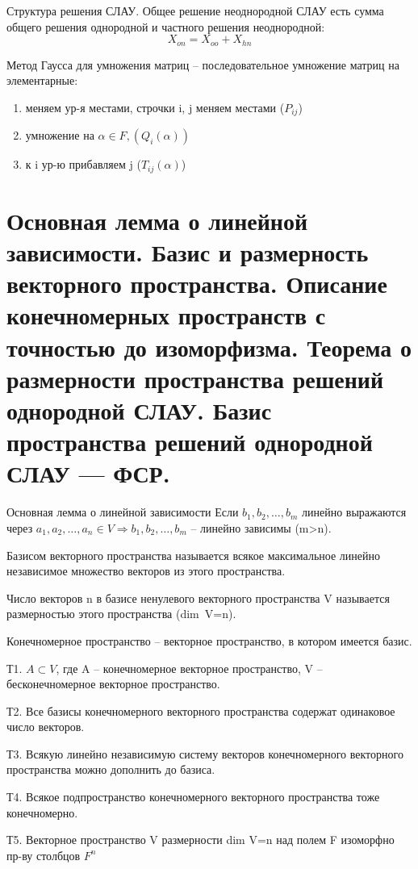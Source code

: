 \documentclass{article}
\begin{document}
\textsf{Структура решения СЛАУ.} Общее решение неоднородной СЛАУ есть сумма общего решения однородной и частного решения неоднородной:
$$X_{on}=X_{oo}+X_{hn}$$


\textsf{Метод Гаусса для умножения матриц} – последовательное умножение матриц на элементарные:
\begin{enumerate}
    \item меняем ур-я местами, строчки i, j меняем местами ($P_{ij}$)
    \item умножение на $\alpha\in F, (Q_i(\alpha))$ 
    \item к i ур-ю прибавляем j ($T_{ij}(\alpha)$)
\end{enumerate}

\section{Основная лемма о линейной зависимости. Базис и размерность векторного пространства. Описание конечномерных пространств с точностью до изоморфизма. Теорема о размерности пространства решений однородной СЛАУ. Базис пространства решений однородной СЛАУ — ФСР.}

\textsf{Основная лемма о линейной зависимости}
Если $b_1,b_2,\dots,b_m$ линейно выражаются через $a_1,a_2,\dots,a_n\in V \Rightarrow b_1,b_2,\dots,b_m$ – линейно зависимы (m>n).

\textsf{Базисом} векторного пространства называется всякое максимальное линейно независимое множество векторов из этого пространства.

Число векторов n в базисе ненулевого векторного пространства V называется \textsf{размерностью} этого пространства (dim\ V=n).

\textsf{Конечномерное пространство} – векторное пространство, в котором имеется базис.

Т1. $A\subset V$, где A – конечномерное векторное пространство, V – бесконечномерное векторное пространство.

Т2. Все базисы конечномерного векторного пространства содержат одинаковое число векторов.

Т3. Всякую линейно независимую систему векторов конечномерного векторного пространства можно дополнить до базиса.

Т4. Всякое подпространство конечномерного векторного пространства тоже конечномерно.

Т5. Векторное пространство V размерности dim V=n над полем F изоморфно пр-ву столбцов $F^n$
\end{document}
